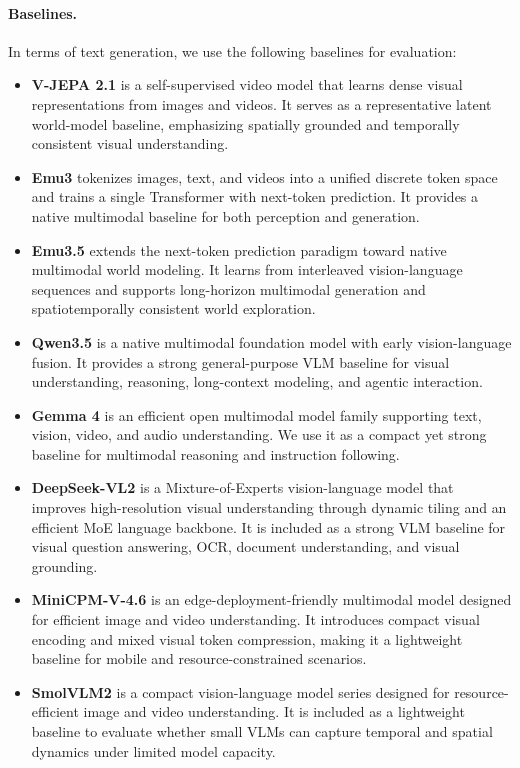 \paragraph{Baselines.} In terms of text generation, we use the following baselines for evaluation:

\begin{itemize}
    \item \textbf{V-JEPA 2.1} \citep{V-JEPA-2.1} is a self-supervised video model that learns dense visual representations from images and videos. It serves as a representative latent world-model baseline, emphasizing spatially grounded and temporally consistent visual understanding.
    \item \textbf{Emu3} \citep{Emu3} tokenizes images, text, and videos into a unified discrete token space and trains a single Transformer with next-token prediction. It provides a native multimodal baseline for both perception and generation.
    \item \textbf{Emu3.5} \citep{Emu35} extends the next-token prediction paradigm toward native multimodal world modeling. It learns from interleaved vision-language sequences and supports long-horizon multimodal generation and spatiotemporally consistent world exploration.
    \item \textbf{Qwen3.5} \citep{qwen35} is a native multimodal foundation model with early vision-language fusion. It provides a strong general-purpose VLM baseline for visual understanding, reasoning, long-context modeling, and agentic interaction.
    \item \textbf{Gemma 4} \citep{Gemma4} is an efficient open multimodal model family supporting text, vision, video, and audio understanding. We use it as a compact yet strong baseline for multimodal reasoning and instruction following.
    \item \textbf{DeepSeek-VL2} \citep{DeepSeek-VL2} is a Mixture-of-Experts vision-language model that improves high-resolution visual understanding through dynamic tiling and an efficient MoE language backbone. It is included as a strong VLM baseline for visual question answering, OCR, document understanding, and visual grounding.
    \item \textbf{MiniCPM-V-4.6} \citep{MiniCPM-o-4.5} is an edge-deployment-friendly multimodal model designed for efficient image and video understanding. It introduces compact visual encoding and mixed visual token compression, making it a lightweight baseline for mobile and resource-constrained scenarios.
    \item \textbf{SmolVLM2} \citep{SmolVLM} is a compact vision-language model series designed for resource-efficient image and video understanding. It is included as a lightweight baseline to evaluate whether small VLMs can capture temporal and spatial dynamics under limited model capacity.
\end{itemize}



